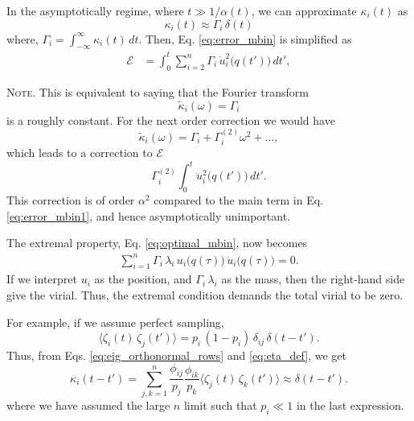 \documentclass[reprint]{revtex4-1}
\newcommand{\note}[1]{{\color{DarkGreen}\footnotesize \textsc{Note.} #1}}
\begin{document}
In the asymptotically regime,
where $t \gg 1/\alpha(t)$,
we can approximate $\kappa_i(t)$ as
%
\begin{equation}
  \kappa_i(t) \approx \Gamma_i \, \delta(t)
  \label{eq:kappa_delta}
\end{equation}
%
where, $\Gamma_i = \int_{-\infty}^\infty \kappa_i(t) \, dt$.
%
Then, Eq. \eqref{eq:error_mbin} is simplified as
%
\begin{align}
  \mathcal E
  &=
  \int_0^t
  \sum_{i = 2}^n
  \Gamma_i \, \dot u_i^2\bigl( q(t') \bigr) \, dt',
  \label{eq:error_mbin1}
\end{align}
%
%
\note{This is equivalent to saying that the Fourier transform
  $$
  \tilde \kappa_i(\omega) = \Gamma_i
  $$
  is a roughly constant.
  For the next order correction we would have
  $$
  \tilde \kappa_i(\omega) = \Gamma_i + \Gamma^{(2)}_i \omega^2 + \dots,
  $$
  which leads to a correction to $\mathcal E$
  $$
  \Gamma^{(2)}_i
  \int_0^t \ddot u_i^2\bigl( q(t') \bigr) \, dt'.
  $$
  This correction is of order $\alpha^2$
  compared to the main term in Eq. \eqref{eq:error_mbin1},
  and hence asymptotically unimportant.

  The extremal property, Eq. \eqref{eq:optimal_mbin},
  now becomes
  \begin{align}
    \sum_{i=1}^n
      \Gamma_i \, \lambda_i \,
      u_i\bigl( q(\tau) \bigr) \,
      \ddot u_i\bigl( q(\tau) \bigr) = 0.
    \label{eq:optimal_mbin1}
  \end{align}
  If we interpret $u_i$ as the position,
  and $\Gamma_i \, \lambda_i$ as the mass,
  then the right-hand side give the virial.
  Thus, the extremal condition demands
  the total virial to be zero.
  $$\,$$
}
%
For example,
if we assume perfect sampling,
%
\begin{equation}
  \langle \zeta_i(t) \, \zeta_j(t') \rangle
  =
  p_i \, (1 - p_i) \, \delta_{ij} \, \delta(t - t').
  \label{eq:zz_perfect}
\end{equation}
%
Thus, from Eqs. \eqref{eq:eig_orthonormal_rows} and \eqref{eq:eta_def},
we get
%
\begin{equation}
  \kappa_i(t - t')
  =
  \sum_{j,k = 1}^n
  \frac{ \phi_{ij} } { p_j }
  \frac{ \phi_{ik} } { p_k }
  \langle \zeta_j(t) \, \zeta_k(t') \rangle
  \approx \delta(t - t').
  \label{eq:kappa_perfect}
\end{equation}
%
where we have assumed the large $n$ limit
such that $p_i \ll 1$
in the last expression.
\end{document}
